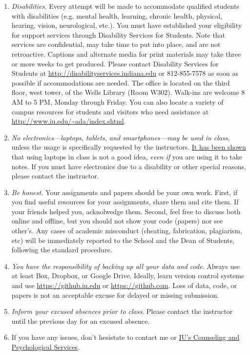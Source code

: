 \documentclass[11pt,article,oneside]{memoir}
\begin{document}
\begin{enumerate}

\item \emph{Disabilities.} Every attempt will be made to accommodate qualified
students with disabilities (e.g. mental health, learning, chronic health,
physical, hearing, vision, neurological, etc.). You must have established your
eligibility for support services through Disability Services for Students. Note
that services are confidential, may take time to put into place, and are not
retroactive.  Captions and alternate media for print materials may take three
or more weeks to get produced. Please contact Disability Services for Students
at \url{http://disabilityservices.indiana.edu} or 812-855-7578 as soon as
possible if accommodations are needed. The office is located on the third
floor, west tower, of the Wells Library (Room W302). Walk-ins are welcome 8 AM
to 5 PM, Monday through Friday. You can also locate a variety of campus
resources for students and visitors who need assistance at
\url{http://www.iu.edu/~ada/index.shtml}. 

\item \emph{No electronics---laptops, tablets, and smartphones---may be used in
class}, unless the usage is specifically requested by the instructors.
\href{http://www.scientificamerican.com/article/a-learning-secret-don-t-take-notes-with-a-laptop/}{It
has been shown} that using laptops in class is not a good idea, \emph{even if}
you are using it to take notes.  If you must have electronics due to a
disability or other special reasons, please contact the instructor. 

\item \emph{Be honest.} Your assignments and papers should be your own work.
First, if you find useful resources for your assignments, share them and cite
them. If your friends helped you, acknolwedge them. Second, feel free to
discuss both online and offline, but you should not show your code (papers) nor
see other's. Any cases of academic misconduct (cheating, fabrication,
plagiarism, etc) will be immediately reported to the School and the Dean of
Students, following the standard procedure. 

\item \emph{You have the responsibility of backing up all your data and code}.
Always use at least Box, Dropbox, or Google Drive. Ideally, learn version
control systems and use \url{https://github.iu.edu} or
\url{https://github.com}. Loss of data, code, or papers is not an acceptable
excuse for delayed or missing submission. 

\item \emph{Inform your excused absences prior to class}. Please contact the
instructor until the previous day for an excused absence.  

\item If you have any issues, don't hesistate to contact me or
\href{http://healthcenter.indiana.edu/counseling/index.shtml}{IU's Counseling
and Psychological Services}.


\end{enumerate}
\end{document}
